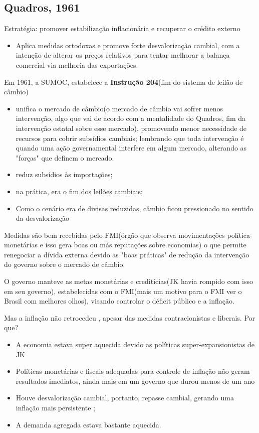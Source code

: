 \documentclass[a4paper,12pt]{article}[abntex2]
\begin{document}
\subsection{\textbf{Quadros, 1961}}

Estratégia: promover estabilização inflacionária e recuperar o crédito externo\begin{itemize}
    \item Aplica medidas ortodoxas e promove forte desvalorização cambial, com a intenção de alterar os preços relativos para tentar melhorar a balança comercial via melhoria das exportações.
\end{itemize}

Em 1961, a SUMOC, estabelece a \textbf{Instrução 204}(fim do sistema de leilão de câmbio)\begin{itemize}
    \item unifica o mercado de câmbio(o mercado de câmbio vai sofrer menos intervenção, algo que vai de acordo com a mentalidade do Quadros, fim da intervenção estatal sobre esse mercado), promovendo menor necessidade de recursos para cobrir subsídios cambiais; lembrando que toda intervenção é quando uma ação governamental interfere em algum mercado, alterando as "forças" que definem o mercado.
    \item reduz subsídios às importações;
    \item na prática, era o fim dos leilões cambiais;
    \item Como o cenário era de divisas reduzidas, câmbio ficou pressionado no sentido da desvalorização
\end{itemize}

Medidas são bem recebidas pelo FMI(órgão que observa movimentações política-monetárias e isso gera boas ou más reputações sobre economias) o que permite renegociar a dívida externa devido as "boas práticas" de redução da intervenção do governo sobre o mercado de câmbio.

O governo manteve as metas monetárias e creditícias(JK havia rompido com isso em seu governo), estabelecidas com o FMI(mais um motivo para o FMI ver o Brasil com melhores olhos), visando controlar o déficit público e a inflação. 

Mas a inflação não retrocedeu , apesar das medidas contracionistas e liberais. Por que?\begin{itemize}
    \item A economia estava super aquecida devido as políticas super-expansionistas de JK
    \item Políticas monetárias e fiscais adequadas para controle de inflação não geram resultados imediatos, ainda mais em um governo que durou menos de um ano
    \item Houve desvalorização cambial, portanto, repasse cambial, gerando uma inflação mais persistente ;
    \item A demanda agregada estava bastante aquecida.
\end{itemize}
\end{document}
